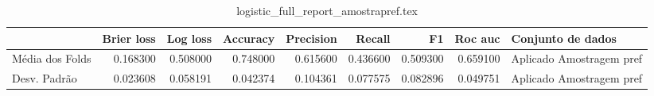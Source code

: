 \begin{table}
\centering
\caption{logistic_full_report_amostrapref.tex}
\label{logistic_full_report_amostrapref.tex}
\begin{tabular}{lrrrrrrrl}
\toprule
{} &  Brier  loss                &  Log loss &  Accuracy  &  Precision  &   Recall  &       F1  &  Roc auc  &         Conjunto de dados \\
\midrule
Média dos Folds &     0.168300 &  0.508000 &   0.748000 &    0.615600 &  0.436600 &  0.509300 &  0.659100 &  Aplicado Amostragem pref \\
Desv. Padrão    &     0.023608 &  0.058191 &   0.042374 &    0.104361 &  0.077575 &  0.082896 &  0.049751 &  Aplicado Amostragem pref \\
\bottomrule
\end{tabular}
\end{table}
